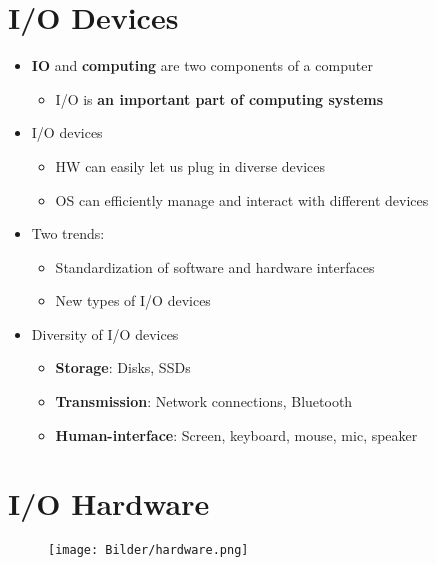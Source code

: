 \documentclass[a4paper,11pt,english]{article}
\begin{document}


\textbf{\color{blue} }

\section*{I/O Devices}
\begin{itemize}
    \item \textbf{\color{blue} IO} and \textbf{\color{blue} computing} are two 
        components of a computer
        \begin{itemize}
            \item I/O is \textbf{\color{blue} an important part of computing systems}
        \end{itemize}
    \item I/O devices
        \begin{itemize}
            \item HW can easily let us plug in diverse devices
            \item OS can efficiently manage and interact with different devices
        \end{itemize}
    \item Two trends:
        \begin{itemize}
            \item Standardization of software and hardware interfaces
            \item New types of I/O devices
        \end{itemize}
    \item Diversity of I/O devices
        \begin{itemize}
            \item \textbf{\color{blue} Storage}: Disks, SSDs
            \item \textbf{\color{blue} Transmission}: Network connections, Bluetooth
            \item \textbf{\color{blue} Human-interface}: Screen, keyboard, mouse, mic, speaker
        \end{itemize}
\end{itemize}

\section*{I/O Hardware}

\begin{figure}[H]
    \centering 
    \texttt{[image: Bilder/hardware.png]}
\end{figure}
\end{document}
